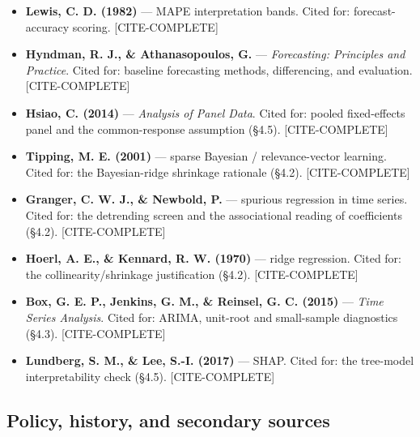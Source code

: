 \documentclass[10pt,twocolumn]{article}
\newcommand{\mkdone}[1]{{\color{metagrey}\footnotesize #1}}
\begin{document}
\begin{itemize}[leftmargin=1.2em,itemsep=1pt,topsep=2pt]

\item \textbf{Lewis, C. D. (1982)} --- MAPE interpretation bands. Cited for: forecast-accuracy scoring. \mkdone{[CITE-COMPLETE]}

\item \textbf{Hyndman, R. J., \& Athanasopoulos, G.} --- \textit{Forecasting: Principles and Practice}. Cited for: baseline forecasting methods, differencing, and evaluation. \mkdone{[CITE-COMPLETE]}

\item \textbf{Hsiao, C. (2014)} --- \textit{Analysis of Panel Data}. Cited for: pooled fixed-effects panel and the common-response assumption (\S{}4.5). \mkdone{[CITE-COMPLETE]}

\item \textbf{Tipping, M. E. (2001)} --- sparse Bayesian / relevance-vector learning. Cited for: the Bayesian-ridge shrinkage rationale (\S{}4.2). \mkdone{[CITE-COMPLETE]}

\item \textbf{Granger, C. W. J., \& Newbold, P.} --- spurious regression in time series. Cited for: the detrending screen and the associational reading of coefficients (\S{}4.2). \mkdone{[CITE-COMPLETE]}

\item \textbf{Hoerl, A. E., \& Kennard, R. W. (1970)} --- ridge regression. Cited for: the collinearity/shrinkage justification (\S{}4.2). \mkdone{[CITE-COMPLETE]}

\item \textbf{Box, G. E. P., Jenkins, G. M., \& Reinsel, G. C. (2015)} --- \textit{Time Series Analysis}. Cited for: ARIMA, unit-root and small-sample diagnostics (\S{}4.3). \mkdone{[CITE-COMPLETE]}

\item \textbf{Lundberg, S. M., \& Lee, S.-I. (2017)} --- SHAP. Cited for: the tree-model interpretability check (\S{}4.5). \mkdone{[CITE-COMPLETE]}

\end{itemize}

\subsection*{Policy, history, and secondary sources}
\end{document}
